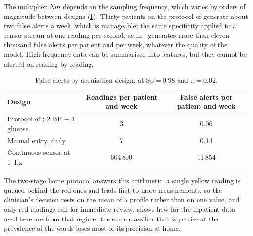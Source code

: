 \documentclass[11pt,a4paper,oneside]{report}
\begin{document}
The multiplier $Nm$ depends on the sampling frequency, which varies by orders of magnitude between designs (\cref{tab:alert-designs}). Thirty patients on the protocol of \textcite{mihevc2025} generate about two false alerts a week, which is manageable; the same specificity applied to a sensor stream at one reading per second, as in \textcite{efendi2025}, generates more than eleven thousand false alerts per patient and per week, whatever the quality of the model. High-frequency data can be summarised into features, but they cannot be alerted on reading by reading.

\begin{table}[htbp]
\centering\small
\caption{False alerts by acquisition design, at $\mathrm{Sp} = 0.98$ and $\pi = 0.02$.}\label{tab:alert-designs}
\begin{tabularx}{\textwidth}{@{}X c c@{}}
\toprule
\textbf{Design} & \textbf{Readings per patient and week} & \textbf{False alerts per patient and week} \\
\midrule
Protocol of \textcite{mihevc2025}: 2 BP + 1 glucose & 3 & 0.06 \\
Manual entry, daily & 7 & 0.14 \\
Continuous sensor at 1~Hz \parencite{efendi2025} & 604\,800 & 11\,854 \\
\bottomrule
\end{tabularx}
\end{table}

The two-stage home protocol answers this arithmetic: a single yellow reading is queued behind the red ones and leads first to more measurements, so the clinician's decision rests on the mean of a profile rather than on one value, and only red readings call for immediate review.  shows how far the inpatient data used here are from that regime: the same classifier that is precise at the prevalence of the wards loses most of its precision at home.
\end{document}
